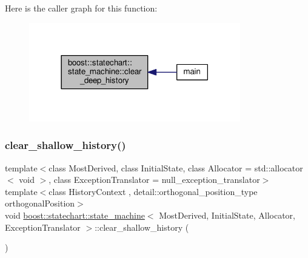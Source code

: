 Here is the caller graph for this function\+:
\nopagebreak
\begin{figure}[H]
\begin{center}
\leavevmode
\includegraphics[width=261pt]{classboost_1_1statechart_1_1state__machine_a5b60164ba8ab165421fad2ecbccad4e8_icgraph}
\end{center}
\end{figure}
\mbox{\label{classboost_1_1statechart_1_1state__machine_a03faf369327ddc16441c8e69db08e861}} 
\subsubsection{\texorpdfstring{clear\+\_\+shallow\+\_\+history()}{clear\_shallow\_history()}}
{\footnotesize\ttfamily template$<$class Most\+Derived, class Initial\+State, class Allocator = std\+::allocator$<$ void $>$, class Exception\+Translator = null\+\_\+exception\+\_\+translator$>$ \\
template$<$class History\+Context , detail\+::orthogonal\+\_\+position\+\_\+type orthogonal\+Position$>$ \\
void \mbox{\hyperlink{classboost_1_1statechart_1_1state__machine}{boost\+::statechart\+::state\+\_\+machine}}$<$ Most\+Derived, Initial\+State, Allocator, Exception\+Translator $>$\+::clear\+\_\+shallow\+\_\+history (\begin{DoxyParamCaption}{ }\end{DoxyParamCaption})\hspace{0.3cm}{\ttfamily [inline]}}

